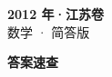 \documentclass[zihao=-4, a4paper]{ctexart}
\begin{document}
\begin{center}
  {\Large\bfseries 2012 年·江苏卷}\\[4pt]
  {\large 数学 · 简答版}
\end{center}
\medskip
{}

\clearpage
{}
\begin{center}{\Large\bfseries 答案速查}\end{center}
\medskip

\end{document}
